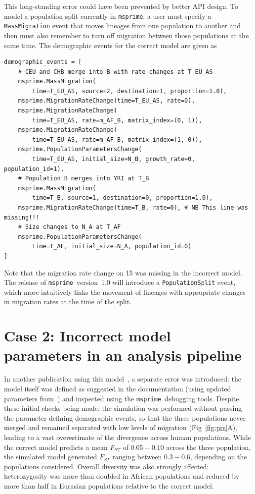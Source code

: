 \documentclass{article}
\newcommand{\msprime}[0]{\texttt{msprime}}
\begin{document}
This long-standing error could have been prevented by better API design.
To model a population split currently in \msprime, a user must specify a
\texttt{MassMigration} event that moves lineages from one population to another
and then must also remember to turn off migration
between those populations at the same time.
The demographic events for the correct model are given as


\begin{verbatim}
demographic_events = [
    # CEU and CHB merge into B with rate changes at T_EU_AS
    msprime.MassMigration(
        time=T_EU_AS, source=2, destination=1, proportion=1.0),
    msprime.MigrationRateChange(time=T_EU_AS, rate=0),
    msprime.MigrationRateChange(
        time=T_EU_AS, rate=m_AF_B, matrix_index=(0, 1)),
    msprime.MigrationRateChange(
        time=T_EU_AS, rate=m_AF_B, matrix_index=(1, 0)),
    msprime.PopulationParametersChange(
        time=T_EU_AS, initial_size=N_B, growth_rate=0, population_id=1),
    # Population B merges into YRI at T_B
    msprime.MassMigration(
        time=T_B, source=1, destination=0, proportion=1.0),
    msprime.MigrationRateChange(time=T_B, rate=0), # NB This line was missing!!!
    # Size changes to N_A at T_AF
    msprime.PopulationParametersChange(
        time=T_AF, initial_size=N_A, population_id=0)
]
\end{verbatim}
Note that the migration rate change on 15 was missing in the incorrect model.
The release of \msprime\ version~1.0 will introduce a \texttt{PopulationSplit} event,
which more intuitively links the movement of lineages with appropriate changes in
migration rates at the time of the split.

\section*{Case 2: Incorrect model parameters in an analysis pipeline}

In another publication using this model~\citep{martin2017human},
a separate error was introduced: the model itself was defined as suggested
in the documentation (using updated parameters
from~\citet{gravel2011demographic}) and inspected
using the \msprime\ debugging tools.
Despite these initial checks being made, the simulation
was performed without passing the parameter defining demographic events,
so that the three populations
never merged and remained separated with low levels of migration (Fig~\ref{fig:prs}A),
leading to a vast overestimate of the divergence across human populations.
While the correct model predicts a mean $F_{ST}$ of
$0.05 - 0.10$ across the three population, the simulated model generated $F_{ST}$
ranging between $0.3 - 0.6$, depending on the populations considered.
Overall diversity was also strongly affected: heterozygosity was more than
doubled in African populations and reduced by more than half in Eurasian populations
relative to the correct model.
\end{document}
